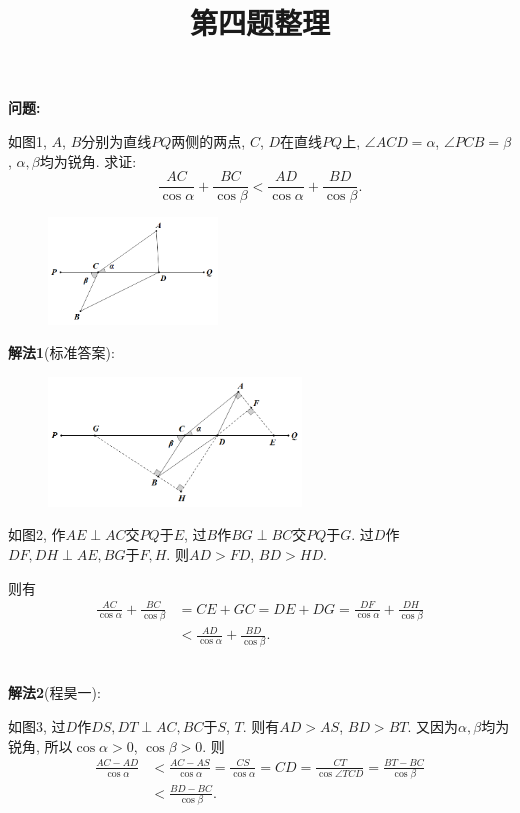 \documentclass{article}
\title{第四题整理}
\author{ }
\date{ }
\begin{document}
\maketitle
\textbf{问题:}\par
{\kaishu 如图1, $A$, $B$分别为直线$PQ$两侧的两点, $C$, $D$在直线$PQ$上, $\angle ACD=\alpha$, $\angle PCB=\beta$, $\alpha, \beta$均为锐角. 求证:
\[\frac{AC}{\cos{\alpha}}+\frac{BC}{\cos{\beta}}<\frac{AD}{\cos{\alpha}}+\frac{BD}{\cos{\beta}}.\]}
\begin{figure}[htbp]
	\centering
	\includegraphics[width=0.4\textwidth]{1.png}
	\caption{}
\end{figure}\par
\textbf{解法1}({\fangsong 标准答案}):
\begin{figure}[htbp]
	\centering
	\includegraphics[width=0.6\textwidth]{2.png}
	\caption{}
\end{figure}
\par
如图2, 作$AE\perp AC$交$PQ$于$E$, 过$B$作$BG\perp BC$交$PQ$于$G$. 过$D$作$DF, DH\perp AE, BG$于$F, H$. 则$AD>FD$, $BD>HD.$\par
则有
\begin{align*}
	\frac{AC}{\cos{\alpha}}+\frac{BC}{\cos{\beta}}&=CE+GC=DE+DG=\frac{DF}{\cos{\alpha}}+\frac{DH}{\cos{\beta}}\\
	&<\frac{AD}{\cos{\alpha}}+\frac{BD}{\cos{\beta}}.
\end{align*}\\\par
\textbf{解法2}({\fangsong 程昊一}):\par
如图3, 过$D$作$DS, DT\perp AC, BC$于$S$, $T$. 则有$AD>AS$, $BD>BT$. 又因为$\alpha, \beta$均为锐角, 所以$\cos{\alpha}>0$, $\cos{\beta}>0$. 则
\begin{align*}
	\frac{AC-AD}{\cos{\alpha}}&<\frac{AC-AS}{\cos{\alpha}}=\frac{CS}{\cos{\alpha}}=CD=\frac{CT}{\cos{\angle TCD}}=\frac{BT-BC}{\cos{\beta}}\\
	&<\frac{BD-BC}{\cos{\beta}}.
\end{align*} 
\end{document}
